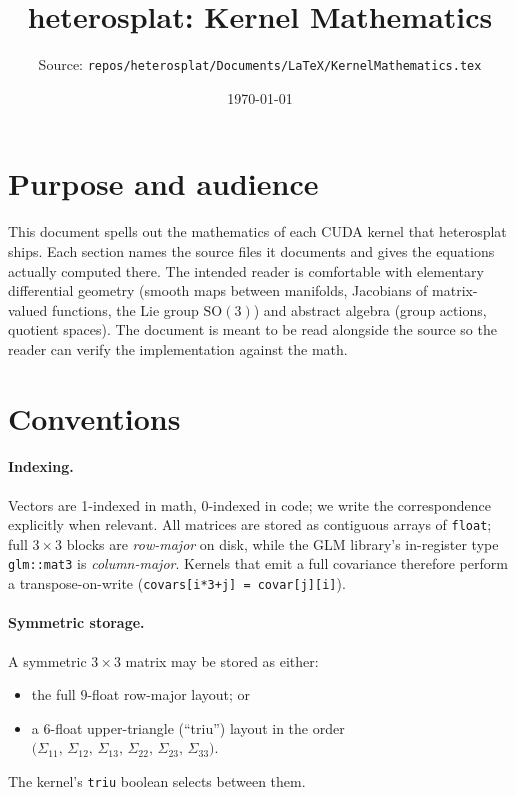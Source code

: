 \documentclass[11pt]{article}
\title{heterosplat: Kernel Mathematics}
\author{Source: \texttt{repos/heterosplat/Documents/LaTeX/KernelMathematics.tex}}
\date{\today}
\newcommand{\SO}{\mathrm{SO}}
\begin{document}
\maketitle

\section{Purpose and audience}

This document spells out the mathematics of each CUDA kernel that
heterosplat ships. Each section names the source files it documents
and gives the equations actually computed there. The intended reader
is comfortable with elementary differential geometry (smooth maps
between manifolds, Jacobians of matrix-valued functions, the Lie
group $\SO(3)$) and abstract algebra (group actions, quotient
spaces). The document is meant to be read alongside the source so
the reader can verify the implementation against the math.

\section{Conventions}

\paragraph{Indexing.}
Vectors are 1-indexed in math, $0$-indexed in code; we write the
correspondence explicitly when relevant. All matrices are stored as
contiguous arrays of \texttt{float}; full $3 \times 3$ blocks are
\emph{row-major} on disk, while the GLM library's in-register type
\texttt{glm::mat3} is \emph{column-major}. Kernels that emit a full
covariance therefore perform a transpose-on-write
(\texttt{covars[i*3+j] = covar[j][i]}).

\paragraph{Symmetric storage.}
A symmetric $3\times 3$ matrix may be stored as either:
\begin{itemize}
  \item the full $9$-float row-major layout; or
  \item a $6$-float upper-triangle (``triu'') layout in the order
  $\bigl(\Sigma_{11},\,\Sigma_{12},\,\Sigma_{13},\,\Sigma_{22},\,\Sigma_{23},\,\Sigma_{33}\bigr)$.
\end{itemize}
The kernel's \texttt{triu} boolean selects between them.
\end{document}
